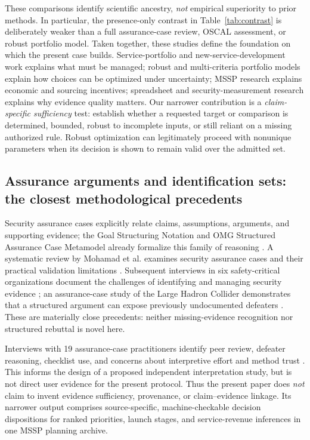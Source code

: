 \documentclass[systems,article,submit,moreauthors]{Definitions/mdpi}
\begin{document}
These comparisons identify scientific ancestry, \emph{not} empirical superiority to prior methods. In particular, the presence-only contrast in Table~\ref{tab:contrast} is deliberately weaker than a full assurance-case review, OSCAL assessment, or robust portfolio model. Taken together, these studies define the foundation on which the present case builds. Service-portfolio and new-service-development work explains what must be managed; robust and multi-criteria portfolio models explain how choices can be optimized under uncertainty; MSSP research explains economic and sourcing incentives; spreadsheet and security-measurement research explains why evidence quality matters. Our narrower contribution is a \emph{claim-specific sufficiency} test: establish whether a requested target or comparison is determined, bounded, robust to incomplete inputs, or still reliant on a missing authorized rule. Robust optimization can legitimately proceed with nonunique parameters when its decision is shown to remain valid over the admitted set.

\subsection{Assurance arguments and identification sets: the closest methodological precedents}
Security assurance cases explicitly relate claims, assumptions, arguments, and supporting evidence; the Goal Structuring Notation and OMG Structured Assurance Case Metamodel already formalize this family of reasoning \cite{GSNv3,SACM2023}. A systematic review by Mohamad et al. examines security assurance cases and their practical validation limitations \cite{Mohamad2021}. Subsequent interviews in six safety-critical organizations document the challenges of identifying and managing security evidence \cite{MohamadEvidence2024}; an assurance-case study of the Large Hadron Collider demonstrates that a structured argument can expose previously undocumented defeaters \cite{Viger2026}. These are materially close precedents: neither missing-evidence recognition nor structured rebuttal is novel here.

Interviews with 19 assurance-case practitioners identify peer review, defeater reasoning, checklist use, and concerns about interpretive effort and method trust \cite{DiemertShorttWeber2025}. This informs the design of a proposed independent interpretation study, but is not direct user evidence for the present protocol. Thus the present paper does \emph{not} claim to invent evidence sufficiency, provenance, or claim--evidence linkage. Its narrower output comprises source-specific, machine-checkable decision dispositions for ranked priorities, launch stages, and service-revenue inferences in one MSSP planning archive.
\end{document}
